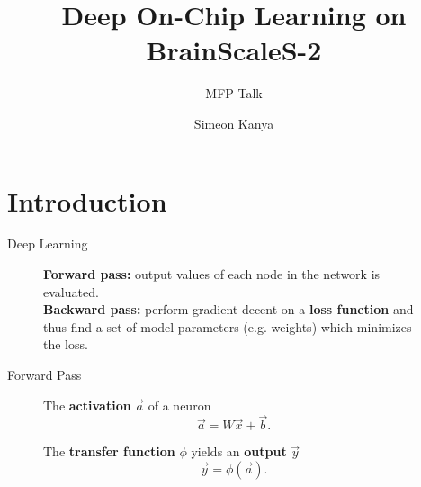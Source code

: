 \documentclass[12pt, aspectratio=169]{beamer}
\title{Deep On-Chip Learning on BrainScaleS-2}
\subtitle{MFP Talk}
\date{}
\author{Simeon Kanya}
\institute{Kirchhoff-Institute for Physics - Electronic Vision(s) Group}
\begin{document}
\maketitle
\section[Intro]{Introduction}

\begin{frame}{Deep Learning}
  \begin{figure}[!htb]
	        \textbf{Forward pass:} output values of each node in the network is evaluated.\\
            
            \textbf{Backward pass:} perform gradient decent on a \textbf{loss function} and thus find a set of model parameters (e.g. weights) which minimizes the loss.\\
	   
            \endminipage\hfill
        \begin{figure}
           \scalebox{1.3}{}
            \label{neural network}
        \end{figure}
        \endminipage\hfill
    \end{figure}
\end{frame}

\begin{frame}{Forward Pass}
  \begin{figure}[!htb]
            The \textbf{activation} $\vec{a}$ of a neuron
            \begin{equation}
                \vec{a} = W \vec{x} + \vec{b}.
            \end{equation}
            
            The \textbf{transfer function} $\phi$ yields an \textbf{output} $\vec{y}$
            \begin{equation}
                \vec{y} = \phi(\vec{a}).
            \end{equation}
            \endminipage\hfill
      	\vspace{20pt}
      	\centering
        \begin{figure}
           \scalebox{1.5}{}
            \label{neural network}
        \end{figure}
        \endminipage\hfill
    \end{figure}
\end{frame}
\end{document}
